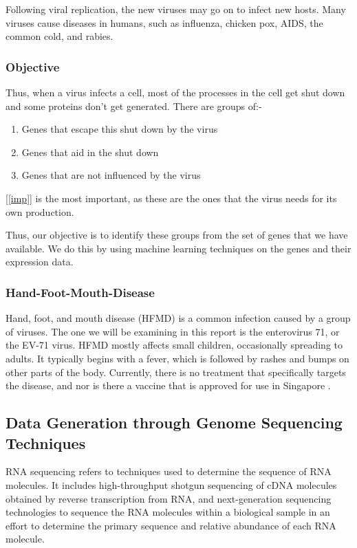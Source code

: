Following viral replication, the new viruses may go on to infect new hosts. Many viruses cause diseases in humans, such as influenza, chicken pox, AIDS, the common cold, and rabies. 

\subsubsection{Objective}

Thus, when a virus infects a cell, most of the processes in the cell get shut down and some proteins don't get generated. There are groups of:-
\begin{enumerate}
    \item Genes that escape this shut down by the virus \label{imp}
    \item Genes that aid in the shut down
    \item Genes that are not influenced by the virus
\end{enumerate}

[\ref{imp}] is the most important, as these are the ones that the virus needs for its own production.

Thus, our objective is to identify these groups from the set of genes that we have available. We do this by using machine learning techniques on the genes and their expression data. 

\subsubsection{Hand-Foot-Mouth-Disease}

Hand, foot, and mouth disease (HFMD) is a common infection caused by a group of viruses. The one we will be examining in this report is the enterovirus 71, or the EV-71 virus. HFMD mostly affects small children, occasionally spreading to adults. It typically begins with a fever, which is followed by rashes and bumps on other parts of the body. Currently, there is no treatment that specifically targets the disease, and nor is there a vaccine that is approved for use in Singapore \cite{ang2009epidemiology}.

\subsection{Data Generation through Genome Sequencing Techniques}

RNA sequencing refers to techniques used to determine the sequence of RNA molecules. It includes high-throughput shotgun sequencing of cDNA molecules obtained by reverse transcription from RNA, and next-generation sequencing technologies to sequence the RNA molecules within a biological sample in an effort to determine the primary sequence and relative abundance of each RNA molecule.

